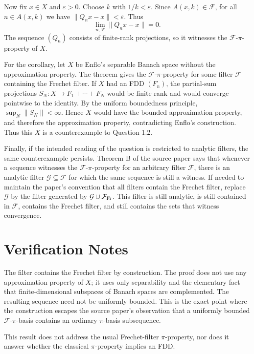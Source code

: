 \documentclass[11pt]{article}
\begin{document}
Now fix \(x\in X\) and \(\varepsilon>0\).  Choose \(k\) with \(1/k<\varepsilon\).
Since \(A(x,k)\in\mathcal F\), for all \(n\in A(x,k)\) we have
\(\|Q_nx-x\|<\varepsilon\).  Thus
\[
\lim_{n,\mathcal F}\|Q_nx-x\|=0.
\]
The sequence \((Q_n)\) consists of finite-rank projections, so it witnesses
the \(\mathcal F\)-\(\pi\)-property of \(X\).

For the corollary, let \(X\) be Enflo's separable Banach space without the
approximation property.  The theorem gives the \(\mathcal F\)-\(\pi\)-property
for some filter \(\mathcal F\) containing the Frechet filter.  If \(X\) had an
FDD \((F_n)\), the partial-sum projections \(S_N:X\to F_1+\cdots+F_N\) would
be finite-rank and would converge pointwise to the identity.  By the uniform
boundedness principle, \(\sup_N\|S_N\|<\infty\).  Hence \(X\) would have the
bounded approximation property, and therefore the approximation property,
contradicting Enflo's construction.  Thus this \(X\) is a counterexample to
Question 1.2.

Finally, if the intended reading of the question is restricted to analytic
filters, the same counterexample persists.  Theorem B of the source paper says
that whenever a sequence witnesses the \(\mathcal F\)-\(\pi\)-property for an
arbitrary filter \(\mathcal F\), there is an analytic filter
\(\mathcal G\subseteq\mathcal F\) for which the same sequence is still a
witness.  If needed to maintain the paper's convention that all filters contain
the Frechet filter, replace \(\mathcal G\) by the filter generated by
\(\mathcal G\cup\mathcal F_{\rm Fr}\).  This filter is still analytic, is still
contained in \(\mathcal F\), contains the Frechet filter, and still contains the
sets that witness convergence.

\section*{Verification Notes}

The filter contains the Frechet filter by construction.  The proof does not
use any approximation property of \(X\); it uses only separability and the
elementary fact that finite-dimensional subspaces of Banach spaces are
complemented.  The resulting sequence need not be uniformly bounded.  This is
the exact point where the construction escapes the source paper's observation
that a uniformly bounded \(\mathcal F\)-\(\pi\)-basis contains an ordinary
\(\pi\)-basis subsequence.

This result does not address the usual Frechet-filter \(\pi\)-property, nor
does it answer whether the classical \(\pi\)-property implies an FDD.
\end{document}
